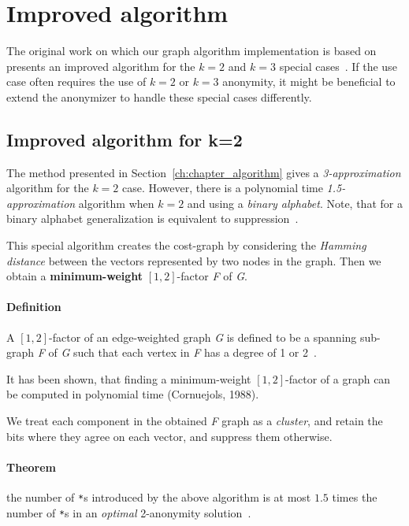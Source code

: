 \section{Improved algorithm}

The original work on which our graph algorithm implementation is based on presents an improved algorithm for the \(k=2\) and \(k=3\) special cases~\cite{aggarwal}. If the use case often requires the use of \(k=2\) or \(k=3\) anonymity, it might be beneficial to extend the anonymizer to handle these special cases differently.

\subsection{Improved algorithm for k=2}\label{subsec:improved_algorithm}
The method presented in Section~\ref{ch:chapter_algorithm} gives a \textit{3-approximation} algorithm for the \(k=2\) case. However, there is a polynomial time \textit{1.5-approximation} algorithm when \(k=2\) and using a \textit{binary alphabet}. Note, that for a binary alphabet generalization is equivalent to suppression~\cite{aggarwal}.

This special algorithm creates the cost-graph by considering the \textit{Hamming distance} between the vectors represented by two nodes in the graph. Then we obtain a \textbf{minimum-weight} \([1,2]\)-factor \textit{F} of \textit{G}.

\paragraph{Definition} A \([1,2]\)-factor of an edge-weighted graph \textit{G} is defined to be a spanning sub-graph \textit{F} of \textit{G} such that each vertex in \textit{F} has a degree of 1 or 2~\cite{aggarwal}.

It has been shown, that finding a minimum-weight \([1,2]\)-factor of a graph can be computed in polynomial time (Cornuejols, 1988).

We treat each component in the obtained \textit{F} graph as a \textit{cluster}, and retain the bits where they agree on each vector, and suppress them otherwise.

\paragraph{Theorem} the number of \texttt{*}s introduced by the above algorithm is at most \(1.5\) times the number of \texttt{*}s in an \textit{optimal} 2-anonymity solution~\cite{aggarwal}.

